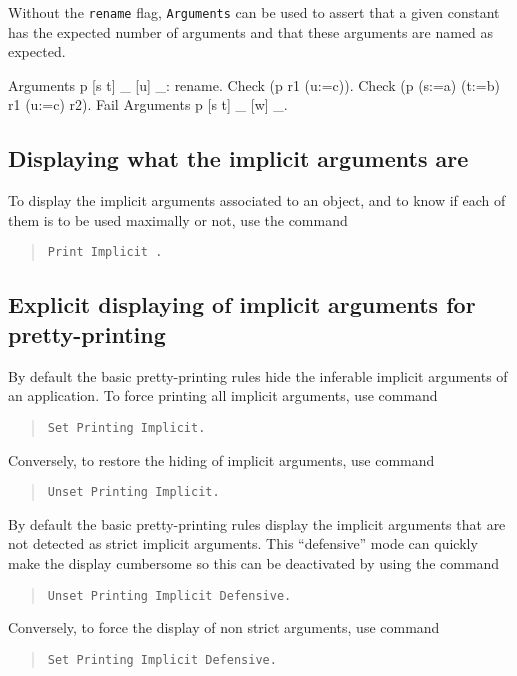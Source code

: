 Without the {\tt rename} flag, {\tt Arguments} can be used to assert
that a given constant has the expected number of arguments and that
these arguments are named as expected.

\begin{coq_example}
Arguments p [s t] _ [u] _: rename.
Check (p r1 (u:=c)).
Check (p (s:=a) (t:=b) r1 (u:=c) r2).
Fail Arguments p [s t] _ [w] _.
\end{coq_example}


\subsection{Displaying what the implicit arguments are
\label{PrintImplicit}}

To display the implicit arguments associated to an object, and to know
if each of them is to be used maximally or not, use the command
\begin{quote}
\tt Print Implicit {\qualid}.
\end{quote}

\subsection{Explicit displaying of implicit arguments for pretty-printing
}

By default the basic pretty-printing rules hide the inferable implicit
arguments of an application. To force printing all implicit arguments,
use command
\begin{quote}
{\tt Set Printing Implicit.}
\end{quote}
Conversely, to restore the hiding of implicit arguments, use command
\begin{quote}
{\tt Unset Printing Implicit.}
\end{quote}

By default the basic pretty-printing rules display the implicit arguments that are not detected as strict implicit arguments. This ``defensive'' mode can quickly make the display cumbersome so this can be deactivated by using the command
\begin{quote}
{\tt Unset Printing Implicit Defensive.}
\end{quote}
Conversely, to force the display of non strict arguments, use command
\begin{quote}
{\tt Set Printing Implicit Defensive.}
\end{quote}

